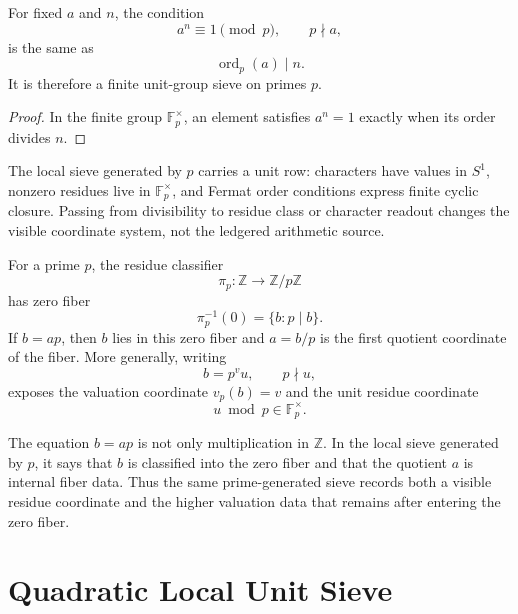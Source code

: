 \begin{corollary}
\label{cor:rh-fermat-order-sieve}
For fixed $a$ and $n$, the condition
$$
a^n\equiv1\pmod p,
\qquad
p\nmid a,
$$
is the same as
$$
\operatorname{ord}_p(a)\mid n.
$$
It is therefore a finite unit-group sieve on primes $p$.
\end{corollary}

\begin{proof}
In the finite group $\mathbb F_p^\times$, an element satisfies
$a^n=1$ exactly when its order divides $n$.
\end{proof}

\begin{principle}
\label{prin:rh-local-prime-sieves-preserve-unit-readout}
The local sieve generated by $p$ carries a unit row: characters have
values in $S^1$, nonzero residues live in $\mathbb F_p^\times$, and
Fermat order conditions express finite cyclic closure.  Passing from
divisibility to residue class or character readout changes the visible
coordinate system, not the ledgered arithmetic source.
\end{principle}

\begin{definition}
\label{def:rh-zero-fiber-quotient-coordinate}
For a prime $p$, the residue classifier
$$
\pi_p:\mathbb Z\to\mathbb Z/p\mathbb Z
$$
has zero fiber
$$
\pi_p^{-1}(0)=\{b:p\mid b\}.
$$
If $b=ap$, then $b$ lies in this zero fiber and $a=b/p$ is the first
quotient coordinate of the fiber.  More generally, writing
$$
b=p^v u,
\qquad
p\nmid u,
$$
exposes the valuation coordinate $v_p(b)=v$ and the unit residue
coordinate
$$
u\bmod p\in\mathbb F_p^\times.
$$
\end{definition}

\begin{principle}
\label{prin:rh-divisibility-fiber-readout}
The equation $b=ap$ is not only multiplication in $\mathbb Z$.  In the
local sieve generated by $p$, it says that $b$ is classified into the
zero fiber and that the quotient $a$ is internal fiber data.  Thus the
same prime-generated sieve records both a visible residue coordinate
and the higher valuation data that remains after entering the zero
fiber.
\end{principle}

\section{Quadratic Local Unit Sieve}
\label{sec:rh-prime-sieve-tower-quadratic-local-unit}

